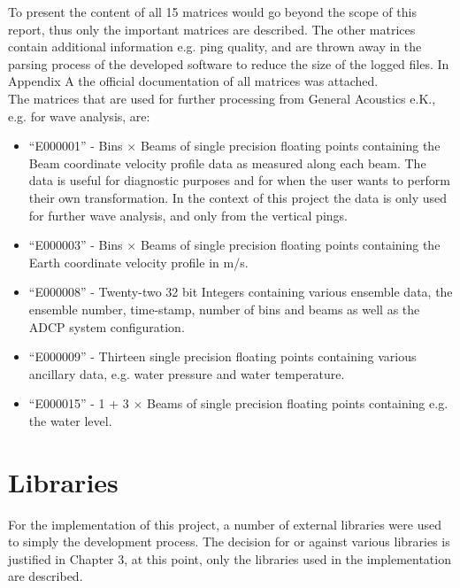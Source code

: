To present the content of all 15 matrices would go beyond the scope of this report, thus only the important matrices are described. The other matrices contain additional information e.g. ping quality, and are thrown away in the parsing process of the developed software to reduce the size of the logged files. In Appendix A the official documentation of all matrices was attached.\\
The matrices that are used for further processing from General Acoustics e.K., e.g. for wave analysis, are:
\begin{itemize}
\item ``E000001'' - Bins $\times$ Beams of single precision floating points containing  the Beam coordinate velocity profile data as measured along each beam. The data is useful for diagnostic purposes and for when the user wants to perform their own transformation. In the context of this project the data is only used for further wave analysis, and only from the vertical pings.
\item``E000003'' - Bins $\times$ Beams of single precision floating points containing the Earth coordinate velocity profile in m/s. 
\item ``E000008'' - Twenty-two 32 bit Integers containing various ensemble data, the ensemble number, time-stamp, number of bins and beams as well as the ADCP system configuration.
\item ``E000009'' - Thirteen single precision floating points containing various ancillary data, e.g. water pressure and water temperature.
\item ``E000015'' - 1 + 3 $\times$ Beams of single precision floating points containing e.g. the water level. 
\end{itemize}

\section{Libraries}
For the implementation of this project, a number of external libraries were used to simply the development process. The decision for or against various libraries is justified in Chapter 3, at this point, only the libraries used in the implementation are described.
